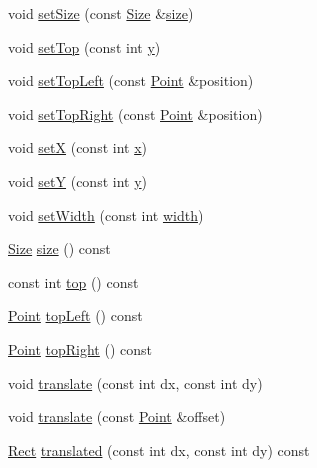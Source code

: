 \begin{DoxyCompactItemize}
void \hyperlink{classprism_1_1_rect_a53275ba29c1cdb4db5a728f26eae9662}{set\+Size} (const \hyperlink{classprism_1_1_size}{Size} \&\hyperlink{classprism_1_1_rect_adcbe6d279ad57294c88d287057867a2b}{size})
\item 
void \hyperlink{classprism_1_1_rect_afb4e4ead74ed1d0bf300fb37266b47d4}{set\+Top} (const int \hyperlink{classprism_1_1_rect_a6e951744e0bba0fed781b86ab0be680b}{y})
\item 
void \hyperlink{classprism_1_1_rect_ae417c702d2ae34b49bb98d38c4b769a4}{set\+Top\+Left} (const \hyperlink{classprism_1_1_point}{Point} \&position)
\item 
void \hyperlink{classprism_1_1_rect_a160eff655569c91544cb4559663b7397}{set\+Top\+Right} (const \hyperlink{classprism_1_1_point}{Point} \&position)
\item 
void \hyperlink{classprism_1_1_rect_a52362693dd88bececa0ee8083e316792}{setX} (const int \hyperlink{classprism_1_1_rect_a202fa9a56964c9111a968fb9b420f5f4}{x})
\item 
void \hyperlink{classprism_1_1_rect_a4a55e496695d8ccbcadd49305bf22617}{setY} (const int \hyperlink{classprism_1_1_rect_a6e951744e0bba0fed781b86ab0be680b}{y})
\item 
void \hyperlink{classprism_1_1_rect_a8e6c00c46158a9c993e7fb33f3d8befd}{set\+Width} (const int \hyperlink{classprism_1_1_rect_a8dae47a50fdac7a5f7e8aabef68437aa}{width})
\item 
\hyperlink{classprism_1_1_size}{Size} \hyperlink{classprism_1_1_rect_adcbe6d279ad57294c88d287057867a2b}{size} () const 
\item 
const int \hyperlink{classprism_1_1_rect_a1e89336f88213ac0672643d188133bab}{top} () const 
\item 
\hyperlink{classprism_1_1_point}{Point} \hyperlink{classprism_1_1_rect_a2900a6e837124886d2e6aa500fba5bde}{top\+Left} () const 
\item 
\hyperlink{classprism_1_1_point}{Point} \hyperlink{classprism_1_1_rect_a0a5e7ccdaeb397649e1e9331110a7343}{top\+Right} () const 
\item 
void \hyperlink{classprism_1_1_rect_a18f564924e2d800589ddf8af039fa248}{translate} (const int dx, const int dy)
\item 
void \hyperlink{classprism_1_1_rect_ab4fd05471a4321adf84dadefa85668b7}{translate} (const \hyperlink{classprism_1_1_point}{Point} \&offset)
\item 
\hyperlink{classprism_1_1_rect}{Rect} \hyperlink{classprism_1_1_rect_accc97050ae8799c21cd64500b1a783dd}{translated} (const int dx, const int dy) const 

\end{DoxyCompactItemize}
